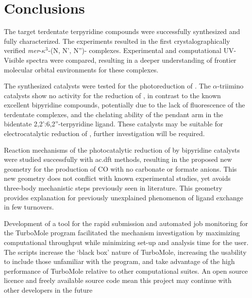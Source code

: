 \chapter{Conclusions}

The target  terdentate terpyridine compounds were successfully synthesized and fully characterized. The experiments resulted in the first crystalographically verified \textit{mer}-$\kappa^3$-(N, N', N'')- complexes. Experimental and computational UV-Visible spectra were compared, resulting in a deeper understanding of frontier molecular orbital environments for these complexes. 

The synthesized catalysts were tested for the photoreduction of . The $\alpha$-triimino catalysts show no activity for the reduction of , in contrast to the known excellent bipyridine compounds, potentially due to the lack of fluorescence of the terdentate complexes, and the chelating ability of the pendant arm in the bidentate 2,2':6,2''-terpyridine ligand. These catalysts may be suitable for electrocatalytic reduction of , further investigation will be required.

Reaction mechanisms of the photocatalytic reduction of  by bipyridine catalysts were studied successfully with \gls{ac.dft} methods, resulting in the proposed new geometry for the production of {CO} with no carbonate or formate anions. This new geometry does not conflict with known experimental studies, yet avoids three-body mechanistic steps previously seen in literature. This geometry provides explanation for previously unexplained phenomenon of  ligand exchange in few turnovers.

Development of a tool for the rapid submission and automated job monitoring for the TurboMole program facilitated the mechanism investigation by maximizing computational throughput while minimizing set-up and analysis time for the user. The scripts increase the `black box' nature of TurboMole, increasing the usability to include those unfamiliar with the program, and take advantage of the high performance of TurboMole relative to other computational suites. An open source licence and freely available source code mean this project may continue with other developers in the future



